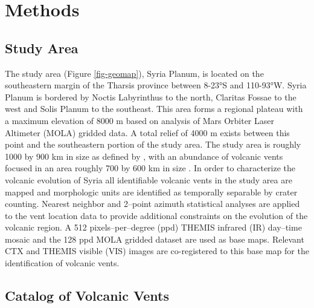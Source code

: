 \section{Methods}

\subsection{Study Area}

The study area (Figure \ref{fig-geomap}), Syria Planum, is located on the southeastern margin of the Tharsis province between 8-23°S and 110-93°W. Syria Planum is bordered by Noctis Labyrinthus to the north, Claritas Fossae to the west and Solis Planum to the southeast. This area forms a regional plateau with a maximum elevation of 8000 m based on analysis of Mars Orbiter Laser Altimeter (MOLA) \citep{Smith2003} gridded data. A total relief of 4000 m exists between this point and the southeastern portion of the study area. The study area is roughly 1000 by 900 km in size as defined by \citet{Scott1986}, with an abundance of volcanic vents focused in an area roughly 700 by 600 km in size \citep{Richardson2010,Richardson2012}. In order to characterize the volcanic evolution of Syria all identifiable volcanic vents in the study area are mapped and morphologic units are identified as temporally separable by crater counting. Nearest neighbor and 2--point azimuth statistical analyses are applied to the vent location data to provide additional constraints on the evolution of the volcanic region. A 512 pixels--per--degree (ppd) THEMIS infrared (IR) day--time mosaic \citep{Christensen2004} and the 128 ppd MOLA gridded dataset \citep{Smith2003} are used as base maps. Relevant CTX \citep{Malin2007} and THEMIS visible (VIS) \citep{Christensen2004} images are co-registered to this base map for the identification of volcanic vents.

\subsection{Catalog of Volcanic Vents}

